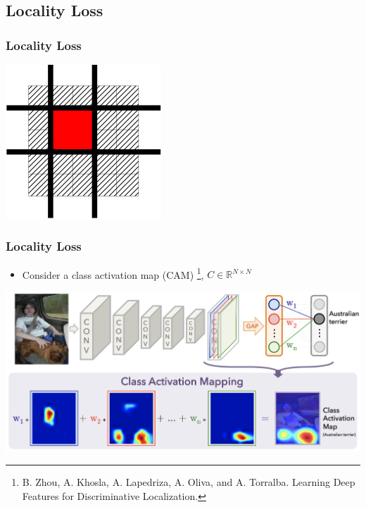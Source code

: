 \subsection{Locality Loss}

\begin{frame}
	\frametitle{Locality Loss}
	\includegraphics[scale=1, center]{images/locality1.png}
\end{frame}


\begin{frame}
	\frametitle{Locality Loss}
	\begin{itemize}
		\item Consider a class activation map (CAM) \footnote{\tiny{B. Zhou, A. Khosla, A.
			Lapedriza, A. Oliva, and A. Torralba. Learning Deep Features for Discriminative
			Localization.}}, $C \in \mathbb{R}^{N \times N}$
	\end{itemize}
	\includegraphics[scale=0.3, center]{images/cam.png}
\end{frame}

